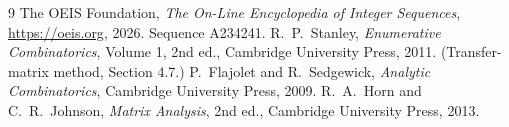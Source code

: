 \documentclass[11pt,a4paper]{article}
\theoremstyle{plain}
\theoremstyle{definition}
\begin{document}
\begin{thebibliography}{9}
 The OEIS Foundation, \emph{The On-Line Encyclopedia of Integer
Sequences}, \url{https://oeis.org}, 2026. Sequence A234241.
 R.~P.~Stanley, \emph{Enumerative Combinatorics}, Volume 1, 2nd ed.,
Cambridge University Press, 2011. (Transfer-matrix method, Section 4.7.)
 P.~Flajolet and R.~Sedgewick, \emph{Analytic Combinatorics}, Cambridge
University Press, 2009.
 R.~A.~Horn and C.~R.~Johnson, \emph{Matrix Analysis}, 2nd ed., Cambridge
University Press, 2013.
\end{thebibliography}
\end{document}
